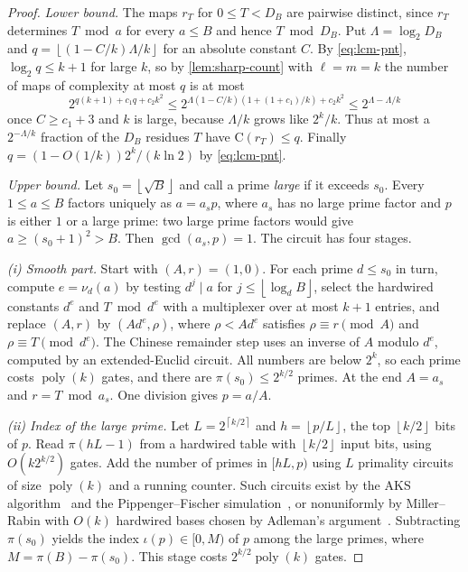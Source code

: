 \documentclass[11pt]{article}
\theoremstyle{definition}
\theoremstyle{remark}
\newcommand{\CC}{\mathrm{C}}
\newcommand{\poly}{\operatorname{poly}}
\newcommand{\floor}[1]{\left\lfloor #1\right\rfloor}
\newcommand{\ceil}[1]{\left\lceil #1\right\rceil}
\numberwithin{equation}{section}
\begin{document}
\begin{proof}
\emph{Lower bound.}  The maps $r_T$ for $0\leq T<D_B$ are pairwise
distinct, since $r_T$ determines $T\bmod a$ for every $a\leq B$ and hence
$T\bmod D_B$.  Put $\Lambda=\log_2D_B$ and
$q=\floor{(1-C/k)\Lambda/k}$ for an absolute constant $C$.  By
\cref{eq:lcm-pnt}, $\log_2 q\leq k+1$ for large $k$, so by
\cref{lem:sharp-count} with $\ell=m=k$ the number of maps of complexity at
most $q$ is at most
\[
  2^{q(k+1)+c_1q+c_2k^2}
  \leq 2^{\Lambda(1-C/k)(1+(1+c_1)/k)+c_2k^2}
  \leq 2^{\Lambda-\Lambda/k}
\]
once $C\geq c_1+3$ and $k$ is large, because $\Lambda/k$ grows like
$2^k/k$.  Thus at most a $2^{-\Lambda/k}$ fraction of the $D_B$ residues
$T$ have $\CC(r_T)\leq q$.  Finally
$q=(1-O(1/k))2^k/(k\ln2)$ by \cref{eq:lcm-pnt}.

\emph{Upper bound.}  Let $s_0=\floor{\sqrt B}$ and call a prime
\emph{large} if it exceeds $s_0$.  Every $1\leq a\leq B$ factors uniquely as
$a=a_sp$, where $a_s$ has no large prime factor and $p$ is either $1$ or a
large prime: two large prime factors would give $a\geq(s_0+1)^2>B$.
Then $\gcd(a_s,p)=1$.  The circuit has four stages.

\emph{(i) Smooth part.}  Start with $(A,r)=(1,0)$.  For each prime
$d\leq s_0$ in turn, compute $e=\nu_d(a)$ by testing $d^j\mid a$ for
$j\leq\floor{\log_dB}$, select the hardwired constants $d^e$ and
$T\bmod d^e$ with a multiplexer over at most $k+1$ entries, and replace
$(A,r)$ by $(Ad^e,\rho)$, where $\rho<Ad^e$ satisfies $\rho\equiv r\pmod A$
and $\rho\equiv T\pmod{d^e}$.  The Chinese remainder step uses an inverse
of $A$ modulo $d^e$, computed by an extended-Euclid circuit.  All numbers
are below $2^k$, so each prime costs $\poly(k)$ gates, and there are
$\pi(s_0)\leq2^{k/2}$ primes.  At the end $A=a_s$ and $r=T\bmod a_s$.
One division gives $p=a/A$.

\emph{(ii) Index of the large prime.}  Let $L=2^{\ceil{k/2}}$ and
$h=\floor{p/L}$, the top $\floor{k/2}$ bits of $p$.  Read
$\pi(hL-1)$ from a hardwired table with $\floor{k/2}$ input bits, using
$O(k2^{k/2})$ gates.  Add the number of primes in $[hL,p)$ using $L$
primality circuits of size $\poly(k)$ and a running counter.  Such
circuits exist by the AKS algorithm~\cite{AKS04} and the Pippenger--Fischer
simulation~\cite{PF79}, or nonuniformly by Miller--Rabin with
$O(k)$ hardwired bases chosen by Adleman's argument~\cite{Adleman78}.
Subtracting $\pi(s_0)$ yields the index $\iota(p)\in[0,M)$ of $p$ among
the large primes, where $M=\pi(B)-\pi(s_0)$.  This stage costs
$2^{k/2}\poly(k)$ gates.


\end{proof}
\end{document}
